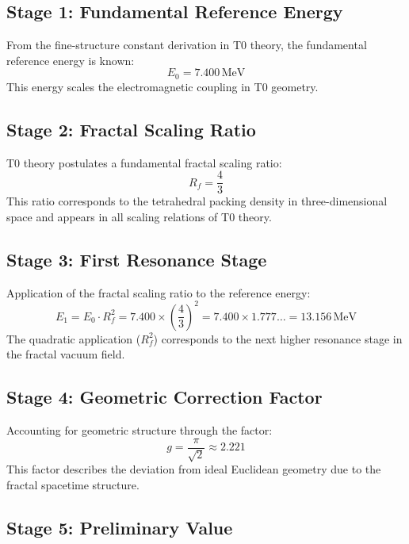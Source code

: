 	\subsection{Stage 1: Fundamental Reference Energy}
	
	From the fine-structure constant derivation in T0 theory, the fundamental reference energy is known:
	\begin{equation}
		E_0 = 7.400\,\text{MeV}
	\end{equation}
	This energy scales the electromagnetic coupling in T0 geometry.
	
	\subsection{Stage 2: Fractal Scaling Ratio}
	
	T0 theory postulates a fundamental fractal scaling ratio:
	\begin{equation}
		R_f = \frac{4}{3}
	\end{equation}
	This ratio corresponds to the tetrahedral packing density in three-dimensional space and appears in all scaling relations of T0 theory.
	
	\subsection{Stage 3: First Resonance Stage}
	
	Application of the fractal scaling ratio to the reference energy:
	\begin{equation}
		E_1 = E_0 \cdot R_f^2 = 7.400 \times \left(\frac{4}{3}\right)^2 = 7.400 \times 1.777\ldots = 13.156\,\text{MeV}
	\end{equation}
	The quadratic application ($R_f^2$) corresponds to the next higher resonance stage in the fractal vacuum field.
	
	\subsection{Stage 4: Geometric Correction Factor}
	
	Accounting for geometric structure through the factor:
	\begin{equation}
		g = \frac{\pi}{\sqrt{2}} \approx 2.221
	\end{equation}
	This factor describes the deviation from ideal Euclidean geometry due to the fractal spacetime structure.
	
	\subsection{Stage 5: Preliminary Value}
	
